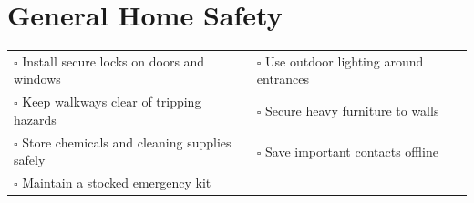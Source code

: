 
\section{General Home Safety}
\label{sec:general}

\begin{tabular}{p{9cm} p{8cm}}
$\square$ Install secure locks on doors and windows & $\square$ Use outdoor lighting around entrances \\ 
$\square$ Keep walkways clear of tripping hazards & $\square$ Secure heavy furniture to walls \\ 
$\square$ Store chemicals and cleaning supplies safely & $\square$ Save important contacts offline \\ 
$\square$ Maintain a stocked emergency kit & \\ 
\end{tabular}

